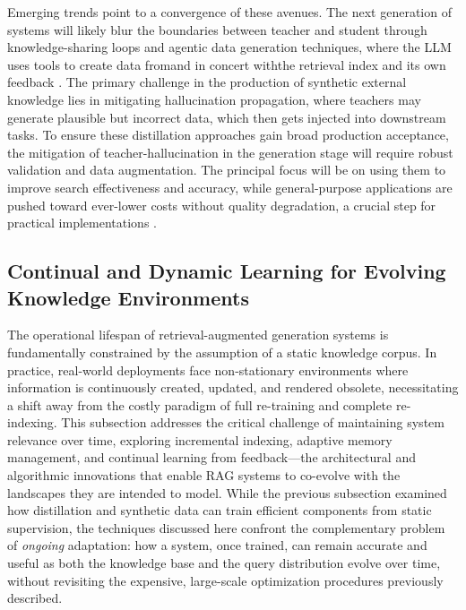 \documentclass[11pt,a4paper]{article}
\begin{document}
Emerging trends point to a convergence of these avenues. The next generation of systems will likely blur the boundaries between teacher and student through knowledge-sharing loops and agentic data generation techniques, where the LLM uses tools to create data fromand in concert withthe retrieval index and its own feedback \cite{arxiv:2412.05838v1,arxiv:2504.15909v2}. The primary challenge in the production of synthetic external knowledge lies in mitigating hallucination propagation, where teachers may generate plausible but incorrect data, which then gets injected into downstream tasks. To ensure these distillation approaches gain broad production acceptance, the mitigation of teacher-hallucination in the generation stage will require robust validation and data augmentation. The principal focus will be on using them to improve search effectiveness and accuracy, while general-purpose applications are pushed toward ever-lower costs without quality degradation, a crucial step for practical implementations \cite{arxiv:2507.18910v1,arxiv:2502.15734v1}.


\subsection{Continual and Dynamic Learning for Evolving Knowledge Environments}


The operational lifespan of retrieval-augmented generation systems is fundamentally constrained by the assumption of a static knowledge corpus. In practice, real-world deployments face non-stationary environments where information is continuously created, updated, and rendered obsolete, necessitating a shift away from the costly paradigm of full re-training and complete re-indexing. This subsection addresses the critical challenge of maintaining system relevance over time, exploring incremental indexing, adaptive memory management, and continual learning from feedback---the architectural and algorithmic innovations that enable RAG systems to co-evolve with the landscapes they are intended to model. While the previous subsection examined how distillation and synthetic data can train efficient components from static supervision, the techniques discussed here confront the complementary problem of \emph{ongoing} adaptation: how a system, once trained, can remain accurate and useful as both the knowledge base and the query distribution evolve over time, without revisiting the expensive, large-scale optimization procedures previously described.
\end{document}
